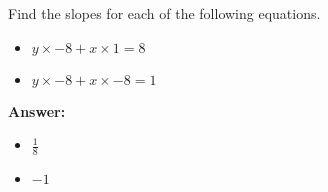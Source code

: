  Find the slopes for each of the following equations. \begin{itemize}\item \( y \times -8 + x \times 1 = 8 \)\item \( y \times -8 + x \times -8 = 1 \)\end{itemize}

        \textbf{Answer:} \begin{itemize}\item \( \frac{1}{8} \)\item \( -1 \)\end{itemize}
